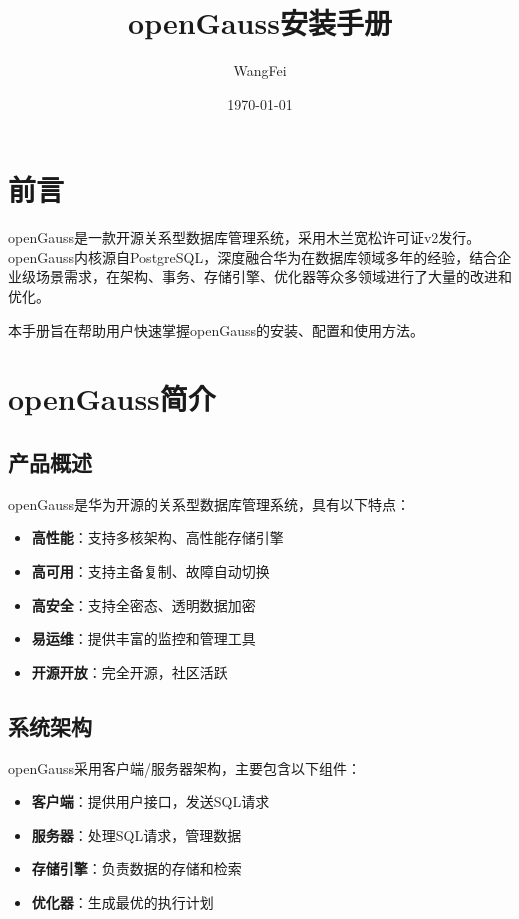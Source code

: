 \documentclass[12pt,UTF8]{ctexbook}
\title{\heiti\zihao{0} openGauss安装手册}
\author{WangFei}
\date{\today}
\begin{document}
\maketitle
\tableofcontents

\frontmatter
\chapter{前言}

openGauss是一款开源关系型数据库管理系统，采用木兰宽松许可证v2发行。openGauss内核源自PostgreSQL，深度融合华为在数据库领域多年的经验，结合企业级场景需求，在架构、事务、存储引擎、优化器等众多领域进行了大量的改进和优化。

本手册旨在帮助用户快速掌握openGauss的安装、配置和使用方法。

\mainmatter

\chapter{openGauss简介}

\section{产品概述}

openGauss是华为开源的关系型数据库管理系统，具有以下特点：

\begin{itemize}[leftmargin=2cm]
    \item \textbf{高性能}：支持多核架构、高性能存储引擎
    \item \textbf{高可用}：支持主备复制、故障自动切换
    \item \textbf{高安全}：支持全密态、透明数据加密
    \item \textbf{易运维}：提供丰富的监控和管理工具
    \item \textbf{开源开放}：完全开源，社区活跃
\end{itemize}

\section{系统架构}

openGauss采用客户端/服务器架构，主要包含以下组件：

\begin{itemize}[leftmargin=2cm]
    \item \textbf{客户端}：提供用户接口，发送SQL请求
    \item \textbf{服务器}：处理SQL请求，管理数据
    \item \textbf{存储引擎}：负责数据的存储和检索
    \item \textbf{优化器}：生成最优的执行计划
\end{itemize}
\end{document}
